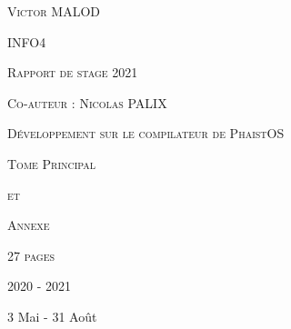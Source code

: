 \begin{titlepage}
    \hfill
    \vfill
    
    \centering
    {\scshape \Large Victor MALOD \par}
    {\scshape \Large INFO4 \par}
    {\scshape \Large Rapport de stage 2021 \par}
    \vspace{5mm}
    {\scshape \normalsize Co-auteur : Nicolas PALIX \par}
    
    \vfill
    {\scshape \huge Développement sur le compilateur de PhaistOS \par}
    
    \vfill
    {\scshape\Large Tome Principal \par}
    {\scshape \Large et \par}
    {\scshape \Large Annexe \par}
    \vspace{5mm}
    {\scshape \small 27 pages \par}
    
    \vfill
    {\Large 2020 - 2021 \par}
    {\Large 3 Mai - 31 Août \par}
\end{titlepage}